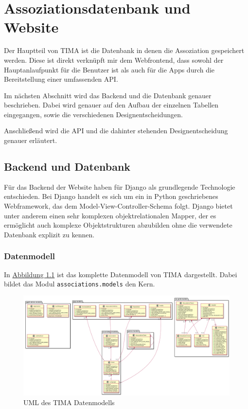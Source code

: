 \chapter{Assoziationsdatenbank und Website}
Der Hauptteil von TIMA ist die Datenbank in denen die Assoziation gespeichert werden. Diese ist direkt verknüpft mir dem Webfrontend, dass sowohl der Hauptanlaufpunkt für die Benutzer ist als auch für die Apps durch die Bereitstellung einer umfassenden API.

Im nächsten Abschnitt wird das Backend und die Datenbank genauer beschrieben. Dabei wird genauer auf den Aufbau der einzelnen Tabellen eingegangen, sowie die verschiedenen Designentscheidungen.

Anschließend wird die API und die dahinter stehenden Designentscheidung genauer erläutert.

\section{Backend und Datenbank}
Für das Backend der Website haben für Django als grundlegende Technologie entschieden. Bei Django handelt es sich um ein in Python geschriebenes Webframework, das dem Model-View-Controller-Schema folgt. Django bietet unter anderem einen sehr komplexen objektrelationalen Mapper, der es ermöglicht auch komplexe Objektstrukturen abzubilden ohne die verwendete Datenbank explizit zu kennen.

\subsection{Datenmodell}
In \hyperref[fig:uml]{Abbildung \ref*{fig:uml}} ist das komplette Datenmodell von TIMA dargestellt. Dabei bildet das Modul \texttt{associations.models} den Kern.

\begin{figure}
	\centering
	\includegraphics[width=\textwidth]{images/uml.png}
	\caption{UML des TIMA Datenmodells}
	\label{fig:uml}
\end{figure}

